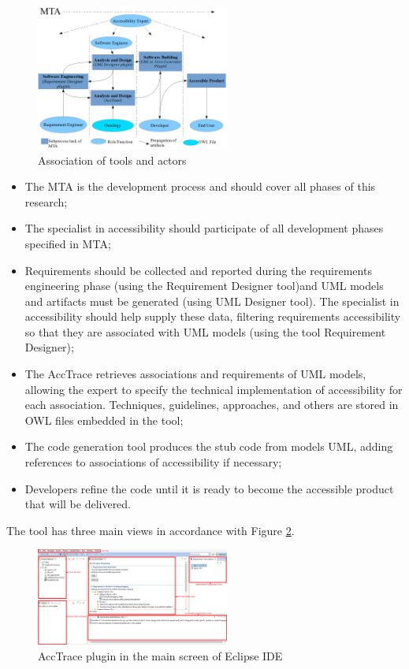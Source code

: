 \documentclass[10pt, conference, compsocconf]{IEEEtran}
\begin{document}
\begin{figure}[!t]
\centering
\includegraphics[width=2.5in]{./img/developmentNew2.png}
\caption{Association of tools and actors}
\label{fig:association}
\end{figure}


\begin{itemize}
  \item The MTA is the development process and should cover all phases of this research;
  \item The specialist in accessibility should participate of all development phases
specified in MTA;
  \item Requirements should be collected and reported during the requirements engineering phase
(using  the Requirement Designer tool)and UML models and artifacts
must be generated (using UML Designer tool). The specialist in accessibility should help supply these data, filtering requirements
accessibility so that they are associated with UML models (using the tool Requirement Designer);
  \item The AccTrace retrieves associations and requirements of UML models, allowing the expert to specify the technical implementation of accessibility for each association. Techniques, guidelines, approaches, and others are stored in OWL files embedded in the tool;
    \item The code generation tool produces the stub code from models
UML, adding references to associations of accessibility if necessary;
  \item Developers refine the code until it is ready to become the
accessible product that will be delivered.
\end{itemize}

The tool has three main views in accordance with Figure \ref{fig:acctrace}. 

\begin{figure}[!t]
\centering
\includegraphics[width=2.5in]{./img/acctrace.png}
\caption{AccTrace plugin in the main screen of
Eclipse IDE}
\label{fig:acctrace}
\end{figure}
\end{document}

